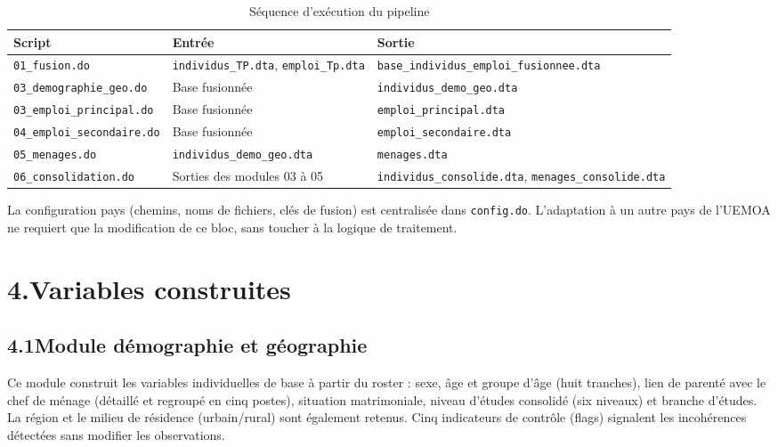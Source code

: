 \documentclass[12pt,a4paper]{article}
\begin{document}
\begin{table}[h!]
\centering
\begin{tabularx}{\linewidth}{llX}
\toprule
\textbf{Script} & \textbf{Entrée} & \textbf{Sortie} \\
\midrule
\texttt{01\_fusion.do}
  & \texttt{individus\_TP.dta}, \texttt{emploi\_Tp.dta}
  & \texttt{base\_individus\_emploi\_fusionnee.dta} \\[4pt]
\texttt{03\_demographie\_geo.do}
  & Base fusionnée
  & \texttt{individus\_demo\_geo.dta} \\[4pt]
\texttt{03\_emploi\_principal.do}
  & Base fusionnée
  & \texttt{emploi\_principal.dta} \\[4pt]
\texttt{04\_emploi\_secondaire.do}
  & Base fusionnée
  & \texttt{emploi\_secondaire.dta} \\[4pt]
\texttt{05\_menages.do}
  & \texttt{individus\_demo\_geo.dta}
  & \texttt{menages.dta} \\[4pt]
\texttt{06\_consolidation.do}
  & Sorties des modules 03 à 05
  & \texttt{individus\_consolide.dta}, \texttt{menages\_consolide.dta} \\
\bottomrule
\end{tabularx}
\caption{Séquence d'exécution du pipeline}
\end{table}

La configuration pays (chemins, noms de fichiers, clés de fusion) est centralisée
dans \texttt{config.do}. L'adaptation à un autre pays de l'UEMOA ne requiert que
la modification de ce bloc, sans toucher à la logique de traitement.

\section*{4.\quad Variables construites}

\subsection*{4.1\quad Module démographie et géographie}

Ce module construit les variables individuelles de base à partir du roster :
sexe, âge et groupe d'âge (huit tranches), lien de parenté avec le chef de
ménage (détaillé et regroupé en cinq postes), situation matrimoniale, niveau
d'études consolidé (six niveaux) et branche d'études. La région et le milieu
de résidence (urbain/rural) sont également retenus. Cinq indicateurs de
contrôle (flags) signalent les incohérences détectées sans modifier les
observations.
\end{document}
